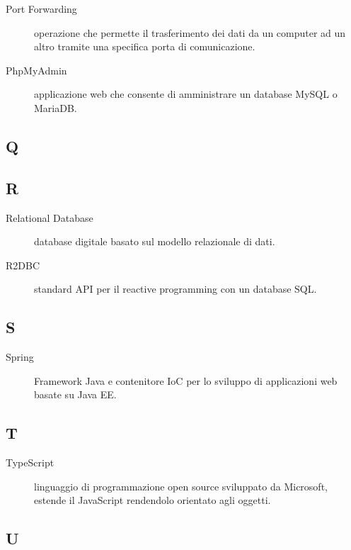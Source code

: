 \documentclass[../../../manuale.sviluppatore.tex]{subfiles}
\begin{document}
\begin{description}
    \item[Port Forwarding] operazione che permette il trasferimento dei dati da un computer ad un altro tramite una specifica porta di comunicazione.
    \item[PhpMyAdmin] applicazione web che consente di amministrare un database MySQL o MariaDB\@.
\end{description}

\subsection{Q}

\subsection{R}

\begin{description}
    \item[Relational Database] database digitale basato sul modello relazionale di dati.
    \item[R2DBC] standard API per il reactive programming con un database SQL\@.
\end{description}

\subsection{S}

\begin{description}
    \item[Spring] Framework Java e contenitore IoC per lo sviluppo di applicazioni web basate su Java EE\@.
\end{description}

\subsection{T}

\begin{description}
    \item[TypeScript] linguaggio di programmazione open source sviluppato da Microsoft, estende il JavaScript rendendolo orientato agli oggetti.
\end{description}

\subsection{U}
\end{document}

